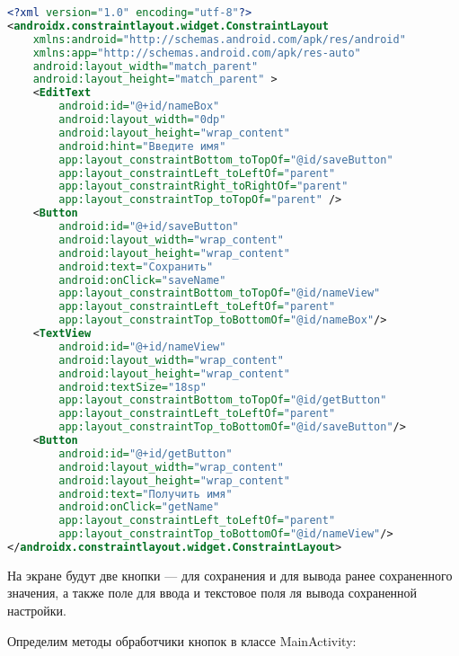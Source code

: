 \begin{lstlisting}[language=XML
	, label=lst:
	]
<?xml version="1.0" encoding="utf-8"?>
<androidx.constraintlayout.widget.ConstraintLayout
    xmlns:android="http://schemas.android.com/apk/res/android"
    xmlns:app="http://schemas.android.com/apk/res-auto"
    android:layout_width="match_parent"
    android:layout_height="match_parent" >
    <EditText
        android:id="@+id/nameBox"
        android:layout_width="0dp"
        android:layout_height="wrap_content"
        android:hint="Введите имя"
        app:layout_constraintBottom_toTopOf="@id/saveButton"
        app:layout_constraintLeft_toLeftOf="parent"
        app:layout_constraintRight_toRightOf="parent"
        app:layout_constraintTop_toTopOf="parent" />
    <Button
        android:id="@+id/saveButton"
        android:layout_width="wrap_content"
        android:layout_height="wrap_content"
        android:text="Сохранить"
        android:onClick="saveName"
        app:layout_constraintBottom_toTopOf="@id/nameView"
        app:layout_constraintLeft_toLeftOf="parent"
        app:layout_constraintTop_toBottomOf="@id/nameBox"/>
    <TextView
        android:id="@+id/nameView"
        android:layout_width="wrap_content"
        android:layout_height="wrap_content"
        android:textSize="18sp"
        app:layout_constraintBottom_toTopOf="@id/getButton"
        app:layout_constraintLeft_toLeftOf="parent"
        app:layout_constraintTop_toBottomOf="@id/saveButton"/>
    <Button
        android:id="@+id/getButton"
        android:layout_width="wrap_content"
        android:layout_height="wrap_content"
        android:text="Получить имя"
        android:onClick="getName"
        app:layout_constraintLeft_toLeftOf="parent"
        app:layout_constraintTop_toBottomOf="@id/nameView"/>
</androidx.constraintlayout.widget.ConstraintLayout>
\end{lstlisting}

На экране будут две кнопки --- для сохранения и для вывода ранее
сохраненного значения, а также поле для ввода и текстовое поля ля вывода
сохраненной настройки.\par
Определим методы обработчики кнопок в классе MainActivity:

